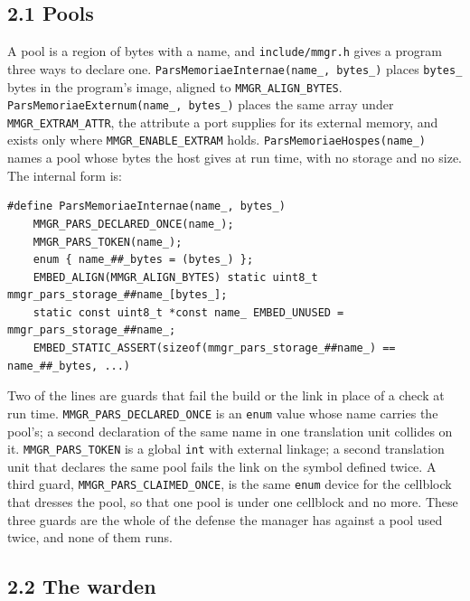 \subsection{\texorpdfstring{2.1 Pools}{2.1 Pools}}

A pool is a region of bytes with a name, and \texttt{include/\allowbreak{}mmgr.\allowbreak{}h} gives a program three ways to declare one. \texttt{Pars\allowbreak{}Memoriae\allowbreak{}Internae(name\_\allowbreak{}, bytes\_\allowbreak{})} places \texttt{bytes\_\allowbreak{}} bytes in the program's image, aligned to \texttt{MMGR\_\allowbreak{}ALIGN\_\allowbreak{}BYTES}. \texttt{Pars\allowbreak{}Memoriae\allowbreak{}Externum(name\_\allowbreak{}, bytes\_\allowbreak{})} places the same array under \texttt{MMGR\_\allowbreak{}EXTRAM\_\allowbreak{}ATTR}, the attribute a port supplies for its external memory, and exists only where \texttt{MMGR\_\allowbreak{}ENABLE\_\allowbreak{}EXTRAM} holds. \texttt{Pars\allowbreak{}Memoriae\allowbreak{}Hospes(name\_\allowbreak{})} names a pool whose bytes the host gives at run time, with no storage and no size. The internal form is:

\begin{Verbatim}
#define ParsMemoriaeInternae(name_, bytes_)
    MMGR_PARS_DECLARED_ONCE(name_);
    MMGR_PARS_TOKEN(name_);
    enum { name_##_bytes = (bytes_) };
    EMBED_ALIGN(MMGR_ALIGN_BYTES) static uint8_t mmgr_pars_storage_##name_[bytes_];
    static const uint8_t *const name_ EMBED_UNUSED = mmgr_pars_storage_##name_;
    EMBED_STATIC_ASSERT(sizeof(mmgr_pars_storage_##name_) == name_##_bytes, ...)
\end{Verbatim}

Two of the lines are guards that fail the build or the link in place of a check at run time. \texttt{MMGR\_\allowbreak{}PARS\_\allowbreak{}DECLARED\_\allowbreak{}ONCE} is an \texttt{enum} value whose name carries the pool's; a second declaration of the same name in one translation unit collides on it. \texttt{MMGR\_\allowbreak{}PARS\_\allowbreak{}TOKEN} is a global \texttt{int} with external linkage; a second translation unit that declares the same pool fails the link on the symbol defined twice. A third guard, \texttt{MMGR\_\allowbreak{}PARS\_\allowbreak{}CLAIMED\_\allowbreak{}ONCE}, is the same \texttt{enum} device for the cellblock that dresses the pool, so that one pool is under one cellblock and no more. These three guards are the whole of the defense the manager has against a pool used twice, and none of them runs.

\subsection{\texorpdfstring{2.2 The warden}{2.2 The warden}}

